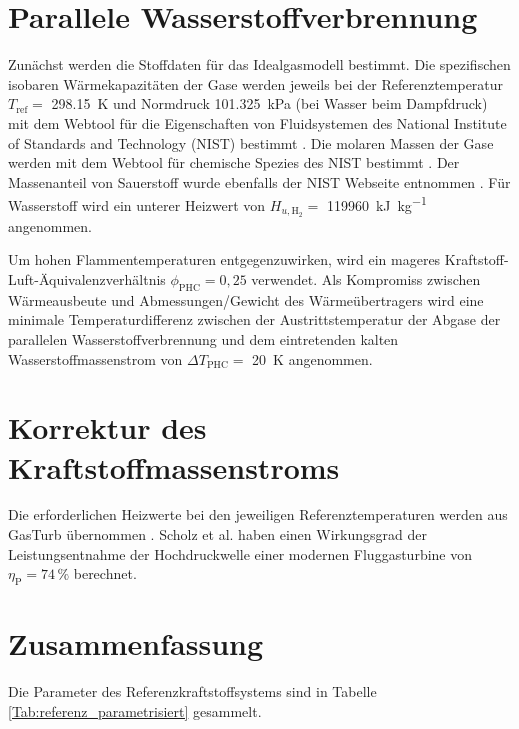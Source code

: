 \section{Parallele Wasserstoffverbrennung}

Zunächst werden die Stoffdaten für das Idealgasmodell bestimmt. Die spezifischen isobaren Wärmekapazitäten der Gase werden jeweils bei der Referenztemperatur $T_{\mathrm{ref}}=$ \SI{298.15}{\K} und Normdruck \SI{101.325}{\kilo\Pa} (bei Wasser beim Dampfdruck) mit dem Webtool für die Eigenschaften von Fluidsystemen des National Institute of Standards and Technology (NIST) bestimmt \cite{NationalInstituteofStandardsandTechnology.2023}. Die molaren Massen der Gase werden mit dem Webtool für chemische Spezies des NIST bestimmt \cite{NationalInstituteofStandardsandTechnology.2}. Der Massenanteil von Sauerstoff wurde ebenfalls der NIST Webseite entnommen \cite{NationalInstituteofStandardsandTechnology.n.d.}. Für Wasserstoff wird ein unterer Heizwert von $H_{u,\mathrm{H}_2}=$ \SI{119960}{\kilo\J\per\kg} angenommen. 

Um hohen Flammentemperaturen entgegenzuwirken, wird ein mageres Kraftstoff-Luft-Äquivalenzverhältnis $\phi_\mathrm{{PHC}}=0,25$ verwendet. Als Kompromiss zwischen Wärmeausbeute und Abmessungen/Gewicht des Wärmeübertragers wird eine minimale Temperaturdifferenz zwischen der Austrittstemperatur der Abgase der parallelen Wasserstoffverbrennung und dem eintretenden kalten Wasserstoffmassenstrom von $\Delta T_{\mathrm{PHC}}=$ \SI{20}{\K} angenommen. 

\section{Korrektur des Kraftstoffmassenstroms}

Die erforderlichen Heizwerte bei den jeweiligen Referenztemperaturen werden aus  GasTurb übernommen \cite{GasTurbGmbH.2021}. Scholz et al. \cite{Scholz.2013} haben einen Wirkungsgrad der Leistungsentnahme der Hochdruckwelle einer modernen Fluggasturbine von $\eta_\mathrm{P}=74\,\%$ berechnet.

\section{Zusammenfassung}

Die Parameter des Referenzkraftstoffsystems sind in Tabelle \ref{Tab:referenz_parametrisiert} gesammelt.

